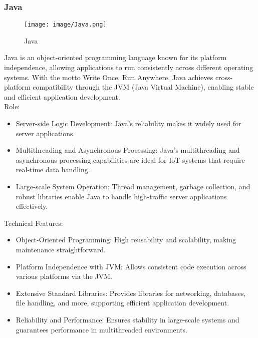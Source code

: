 \documentclass[conference]{IEEEtran}
\begin{document}
\subsubsection{Java}

\begin{figure}[h!]
    \centering
    \texttt{[image: image/Java.png]}
    \caption{Java}
    \label{fig:enter-label}
\end{figure}

\noindent Java is an object-oriented programming language known for its platform independence, allowing applications to run consistently across different operating systems. With the motto Write Once, Run Anywhere, Java achieves cross-platform compatibility through the JVM (Java Virtual Machine), enabling stable and efficient application development. \\

Role:
\begin{itemize}
    \item Server-side Logic Development: Java’s reliability makes it widely used for server applications.\\ 
    \item Multithreading and Asynchronous Processing: Java's multithreading and asynchronous processing capabilities are ideal for IoT systems that require real-time data handling.\\
    \item Large-scale System Operation: Thread management, garbage collection, and robust libraries enable Java to handle high-traffic server applications effectively.\\
\end{itemize}

Technical Features:
\begin{itemize}
    \item Object-Oriented Programming: High reusability and scalability, making maintenance straightforward.\\
    \item Platform Independence with JVM: Allows consistent code execution across various platforms via the JVM.\\
    \item Extensive Standard Libraries: Provides libraries for networking, databases, file handling, and more, supporting efficient application development.\\
    \item Reliability and Performance: Ensures stability in large-scale systems and guarantees performance in multithreaded environments.\\
\end{itemize}
\end{document}
